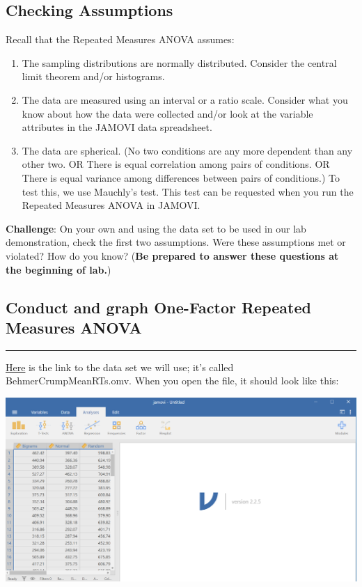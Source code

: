 \documentclass[
]{book}
\begin{document}
\hypertarget{checking-assumptions-1}{%
\subsection{Checking Assumptions}\label{checking-assumptions-1}}

Recall that the Repeated Measures ANOVA assumes:

\begin{enumerate}
\def\labelenumi{\arabic{enumi}.}
\item
  The sampling distributions are normally distributed. Consider the central limit theorem and/or histograms.
\item
  The data are measured using an interval or a ratio scale. Consider what you know about how the data were collected and/or look at the variable attributes in the JAMOVI data spreadsheet.
\item
  The data are spherical. (No two conditions are any more dependent than any other two. OR There is equal correlation among pairs of conditions. OR There is equal variance among differences between pairs of conditions.) To test this, we use Mauchly's test. This test can be requested when you run the Repeated Measures ANOVA in JAMOVI.
\end{enumerate}

\textbf{Challenge}: On your own and using the data set to be used in our lab demonstration, check the first two assumptions. Were these assumptions met or violated? How do you know? (\textbf{Be prepared to answer these questions at the beginning of lab.})

\hypertarget{conduct-and-graph-one-factor-repeated-measures-anova-1}{%
\subsection{Conduct and graph One-Factor Repeated Measures ANOVA}\label{conduct-and-graph-one-factor-repeated-measures-anova-1}}

\begin{center}\rule{0.5\linewidth}{0.5pt}\end{center}

\href{https://moodle.stfx.ca/mod/resource/view.php?id=926115}{Here} is the link to the data set we will use; it's called BehmerCrumpMeanRTs.omv. When you open the file, it should look like this:

\includegraphics{img/BehmerCrump_FileView.png}
\end{document}
